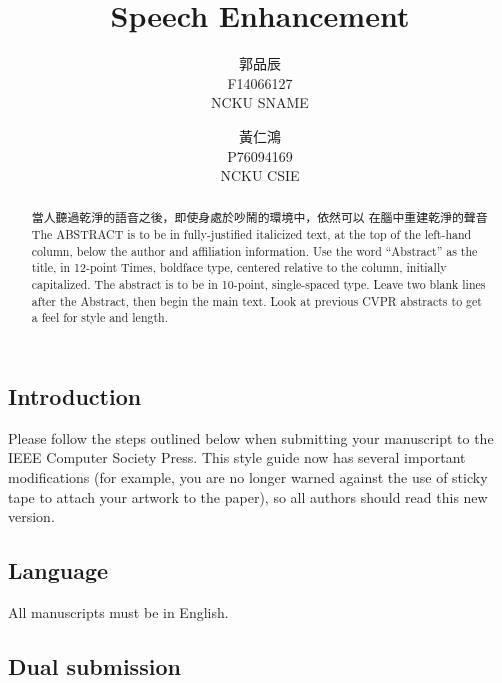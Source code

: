 \documentclass[10pt,twocolumn,letterpaper]{article}
\begin{document}
\begin{CJK}{UTF8}{bkai}
   \title{Speech Enhancement}

   \author{
      郭品辰\\
      F14066127\\
      NCKU SNAME
      \and
      黃仁鴻\\
      P76094169\\
      NCKU CSIE
   }

   \maketitle

   \begin{abstract}
      當人聽過乾淨的語音之後，即使身處於吵鬧的環境中，依然可以
      在腦中重建乾淨的聲音
      The ABSTRACT is to be in fully-justified italicized text, at the top
      of the left-hand column, below the author and affiliation
      information. Use the word ``Abstract'' as the title, in 12-point
      Times, boldface type, centered relative to the column, initially
      capitalized. The abstract is to be in 10-point, single-spaced type.
      Leave two blank lines after the Abstract, then begin the main text.
      Look at previous CVPR abstracts to get a feel for style and length.
   \end{abstract}

   \section{Introduction}

   Please follow the steps outlined below when submitting your manuscript to
   the IEEE Computer Society Press.  This style guide now has several
   important modifications (for example, you are no longer warned against the
   use of sticky tape to attach your artwork to the paper), so all authors
   should read this new version.

   \subsection{Language}

   All manuscripts must be in English.

   \subsection{Dual submission}


\end{CJK}
\end{document}
